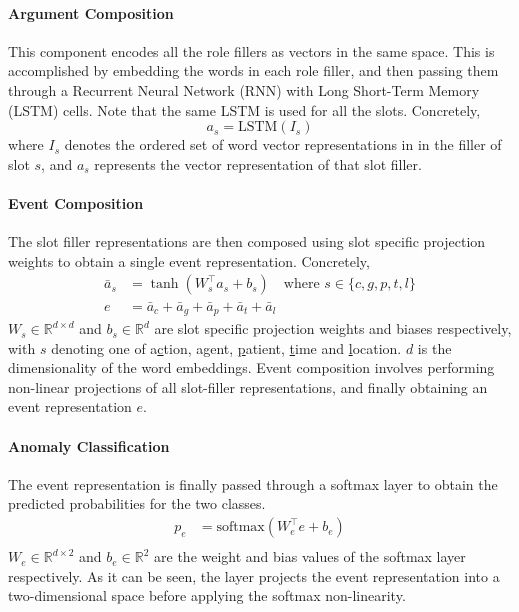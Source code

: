 \paragraph{Argument Composition} This component encodes all the role fillers as vectors in the same space.
This is accomplished by embedding the words in each role filler, and then passing them through a Recurrent
Neural Network (RNN) with Long Short-Term Memory (LSTM) \citep{hochreiter1997long} cells. Note that the same LSTM is
used for all the slots. Concretely,
\begin{equation}
 a_s = \text{LSTM}(I_s)
\end{equation}
where $I_s$ denotes the ordered set of word vector representations in in the filler of slot $s$, and
$a_s$ represents the vector representation of that slot filler.

\paragraph{Event Composition} The slot filler representations are then composed using slot specific
projection weights to obtain a single event representation. Concretely,
\begin{align}
 \bar{a}_s &= \tanh(W_s^\intercal a_s + b_s) \quad \text{where } s \in \{c,g,p,t,l\} \\
 e &=  \bar{a}_c + \bar{a}_g + \bar{a}_p + \bar{a}_t + \bar{a}_l 
\end{align}
$W_s \in \mathbb{R}^{d \times d}$ and $b_s \in \mathbb{R}^{d}$ are slot specific projection weights and biases respectively, with $s$ denoting one of a\underline{c}tion,
a\underline{g}ent, \underline{p}atient, \underline{t}ime and \underline{l}ocation. $d$ is the dimensionality of the word embeddings.
Event composition involves performing non-linear projections of all slot-filler representations, and finally obtaining an event representation
$e$.

\paragraph{Anomaly Classification} The event representation is finally passed through a softmax layer to obtain
the predicted probabilities for the two classes.
\begin{align}
 p_e & = \text{softmax}(W_e^\intercal e + b_e) \\
\end{align}
$W_e \in \mathbb{R}^{d \times 2}$ and $b_e \in \mathbb{R}^2$ are the weight and bias values of the softmax layer respectively.
As it can be seen, the layer projects the event representation into a two-dimensional space before applying the softmax non-linearity.


